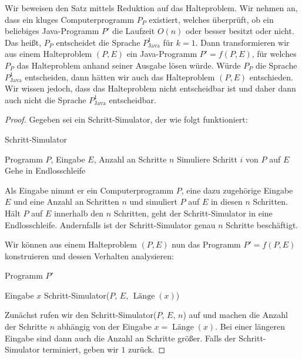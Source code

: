 \documentclass[journal]{IEEEtran}
\begin{document}
Wir beweisen den Satz mittels Reduktion auf das Halteproblem. Wir nehmen an, dass ein kluges Computerprogramm $P_P$ existiert, welches überprüft, ob ein beliebiges Java-Programm $P'$ die Laufzeit $O(n)$ oder besser besitzt oder nicht. Das heißt, $P_P$ entscheidet die Sprache $P_\text{Java}^1$ für $k = 1$. Dann transformieren wir aus einem Halteproblem $(P, E)$ ein Java-Programm $P' = f(P, E)$, für welches $P_P$ das Halteproblem anhand seiner Ausgabe lösen würde. Würde $P_P$ die Sprache $P_\text{Java}^1$ entscheiden, dann hätten wir auch das Halteproblem $(P, E)$ entschieden. Wir wissen jedoch, dass das Halteproblem nicht entscheidbar ist und daher dann auch nicht die Sprache $P_\text{Java}^1$ entscheidbar.

\begin{proof}
Gegeben sei ein Schritt-Simulator, der wie folgt funktioniert:

\begin{algorithm}
\caption{Schritt-Simulator}
\begin{algorithmic}[1]
\renewcommand{\algorithmicrequire}{\textbf{Input:}}
\renewcommand{\algorithmicensure}{\textbf{Output:}}
\REQUIRE Programm $P$, Eingabe $E$, Anzahl an Schritte $n$
  \STATE Simuliere Schritt $i$ von $P$ auf $E$
   \STATE Gehe in Endlosschleife
  \ENDIF
 \ENDFOR
\end{algorithmic}
\end{algorithm}

Als Eingabe nimmt er ein Computerprogramm $P$, eine dazu zugehörige Eingabe $E$ und eine Anzahl an Schritten $n$ und simuliert $P$ auf $E$ in diesen $n$ Schritten. Hält $P$ auf $E$ innerhalb den $n$ Schritten, geht der Schritt-Simulator in eine Endlosschleife. Andernfalls ist der Schritt-Simulator genau $n$ Schritte beschäftigt.

Wir können aus einem Halteproblem $(P, E)$ nun das Programm $P' = f(P, E)$ konstruieren und dessen Verhalten analysieren:

\begin{algorithm}
\caption{Programm $P'$}
\begin{algorithmic}[1]
\renewcommand{\algorithmicrequire}{\textbf{Input:}}
\renewcommand{\algorithmicensure}{\textbf{Output:}}
\REQUIRE Eingabe $x$
\STATE Schritt-Simulator($P$, $E$, $\operatorname{Länge}(x)$)
\end{algorithmic}
\end{algorithm}

Zunächst rufen wir den Schritt-Simulator($P$, $E$, $n$) auf und machen die Anzahl der Schritte $n$ abhängig von der Eingabe $x = \operatorname{Länge}(x)$. Bei einer längeren Eingabe sind dann auch die Anzahl an Schritte größer. Falls der Schritt-Simulator terminiert, geben wir $1$ zurück.


\end{proof}
\end{document}
